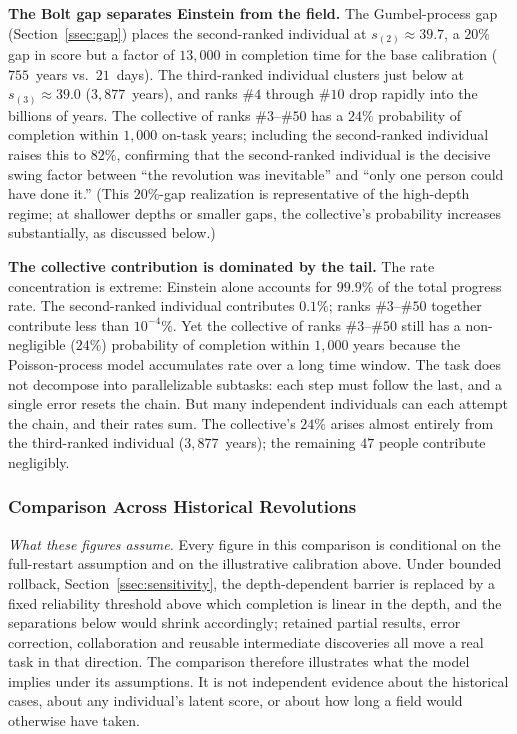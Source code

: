 \documentclass{article}
\begin{document}
\medskip
\noindent\textbf{The Bolt gap separates Einstein from the field.}\;
The Gumbel-process gap (Section~\ref{ssec:gap}) places the
second-ranked individual at $s_{(2)} \approx 39.7$, a $20\%$ gap in
score but a factor of $13{,}000$ in completion time for the base
calibration ($755$~years vs.\ $21$~days). The third-ranked individual
clusters just below at $s_{(3)} \approx 39.0$ ($3{,}877$~years), and
ranks $\#4$ through $\#10$ drop rapidly into the billions of years. The
collective of ranks $\#3$--$\#50$ has a $24\%$ probability of completion within $1{,}000$ on-task years; including the second-ranked
individual raises this to $82\%$, confirming that the second-ranked
individual is the decisive swing factor between ``the revolution was
inevitable'' and ``only one person could have done it.'' (This
$20\%$-gap realization is representative of the high-depth regime;
at shallower depths or smaller gaps, the collective's probability
increases substantially, as discussed below.)

\medskip
\noindent\textbf{The collective contribution is dominated by the tail.}\;
The rate concentration is extreme: Einstein alone accounts for
$99.9\%$ of the total progress rate. The second-ranked individual
contributes $0.1\%$; ranks $\#3$--$\#50$ together contribute less than
$10^{-4}\%$. Yet the collective of ranks $\#3$--$\#50$ still has a
non-negligible ($24\%$) probability of completion within $1{,}000$ years
because the Poisson-process model accumulates rate over a long
time window. The task does not decompose into parallelizable subtasks:
each step must follow the last, and a single error resets the chain.
But many independent individuals can each attempt the chain, and their
rates sum. The collective's $24\%$ arises almost entirely from the
third-ranked individual ($3{,}877$~years); the remaining $47$ people
contribute negligibly.

\subsubsection{Comparison Across Historical Revolutions}

\noindent\textit{What these figures assume.} Every figure in this comparison is conditional on the full-restart assumption and on the illustrative calibration above. Under bounded rollback, Section~\ref{ssec:sensitivity}, the depth-dependent barrier is replaced by a fixed reliability threshold above which completion is linear in the depth, and the separations below would shrink accordingly; retained partial results, error correction, collaboration and reusable intermediate discoveries all move a real task in that direction. The comparison therefore illustrates what the model implies under its assumptions. It is not independent evidence about the historical cases, about any individual's latent score, or about how long a field would otherwise have taken.
\end{document}
